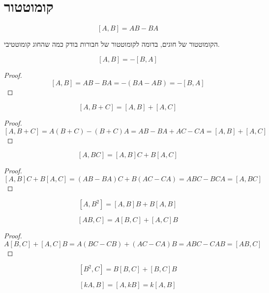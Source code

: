 \documentclass{tstextbook}
\begin{document}
\section{קומוטטור}

\begin{definition}
$$[A,B]=AB-BA$$

\end{definition}
\begin{remark}
הקומוטטור של חוגים, בדומה לקומוטטור של חבורות בודק כמה שהחוג קומוטטיבי.

\end{remark}
\begin{proposition}
$$[A,B]=-[B,A]$$

\end{proposition}
\begin{proof}
$$[A,B]=A B-B A=-(B A-A B)=-[B,A]$$

\end{proof}
\begin{proposition}
$$[A,B+C]=[A,B]+[A,C]$$

\end{proposition}
\begin{proof}
$$[A,B+C]=A(B+C)-(B+C)A=A B-B A+A C-C A=[A,B]+[A,C]$$

\end{proof}
\begin{proposition}
$$[A,BC]=[A,B]C+B[A,C]$$

\end{proposition}
\begin{proof}
$$[A,B]C+B[A,C]=(A B-B A)C+B(A C-C A)=A B C-B C A=[A,B C]$$

\end{proof}
\begin{corollary}
$$[A,B^{2}]=[A,B]B+B[A,B]$$

\end{corollary}
\begin{proposition}
$$[A B,C]=A[B,C]+[A,C]B$$

\end{proposition}
\begin{proof}
$$A[B,C]+[A,C]B=A(B C-C B)+(A C-C A)B=A B C-C A B=[A B,C]$$

\end{proof}
\begin{corollary}
$$[B^{2},C]=B[B,C]+[B,C]B$$

\end{corollary}
\begin{proposition}
$$[k A,B]=[A,k B]=k[A,B]$$

\end{proposition}
\end{document}
